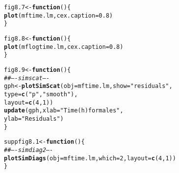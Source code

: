 \documentclass[12pt, a4paper,  BCOR=8.25mm, DIV=15]{scrartcl}\usepackage[]{graphicx}\usepackage[]{color}
\makeatletter
\newcommand{\hlnum}[1]{\textcolor[rgb]{0.686,0.059,0.569}{#1}}%
\newcommand{\hlstr}[1]{\textcolor[rgb]{0.192,0.494,0.8}{#1}}%
\newcommand{\hlcom}[1]{\textcolor[rgb]{0.678,0.584,0.686}{\textit{#1}}}%
\newcommand{\hlstd}[1]{\textcolor[rgb]{0.345,0.345,0.345}{#1}}%
\newcommand{\hlkwa}[1]{\textcolor[rgb]{0.161,0.373,0.58}{\textbf{#1}}}%
\newcommand{\hlkwb}[1]{\textcolor[rgb]{0.69,0.353,0.396}{#1}}%
\newcommand{\hlkwc}[1]{\textcolor[rgb]{0.333,0.667,0.333}{#1}}%
\newcommand{\hlkwd}[1]{\textcolor[rgb]{0.737,0.353,0.396}{\textbf{#1}}}%
\newenvironment{kframe}{%
 \def\at@end@of@kframe{}%
 \ifinner\ifhmode%
  \def\at@end@of@kframe{\end{minipage}}%
  \begin{minipage}{\columnwidth}%
 \fi\fi%
 \def\FrameCommand##1{\hskip\@totalleftmargin \hskip-\fboxsep
 \colorbox{shadecolor}{##1}\hskip-\fboxsep
     \hskip-\linewidth \hskip-\@totalleftmargin \hskip\columnwidth}%
 \MakeFramed {\advance\hsize-\width
   \@totalleftmargin\z@ \linewidth\hsize
   \@setminipage}}%
 {\par\unskip\endMakeFramed%
 \at@end@of@kframe}
\newenvironment{knitrout}{}{} %
\makeatother
\begin{document}
\begin{knitrout}
\color{fgcolor}\begin{kframe}
\begin{alltt}
\hlstd{fig8.7} \hlkwb{<-} \hlkwa{function}\hlstd{()\{}
\hlkwd{plot}\hlstd{(mftime.lm,} \hlkwc{cex.caption}\hlstd{=}\hlnum{0.8}\hlstd{)}
\hlstd{\}}
\end{alltt}
\end{kframe}
\end{knitrout}

\begin{knitrout}
\color{fgcolor}\begin{kframe}
\begin{alltt}
\hlstd{fig8.8} \hlkwb{<-} \hlkwa{function}\hlstd{()\{}
\hlkwd{plot}\hlstd{(mflogtime.lm,} \hlkwc{cex.caption}\hlstd{=}\hlnum{0.8}\hlstd{)}
\hlstd{\}}
\end{alltt}
\end{kframe}
\end{knitrout}

\begin{knitrout}
\color{fgcolor}\begin{kframe}
\begin{alltt}
\hlstd{fig8.9} \hlkwb{<-} \hlkwa{function}\hlstd{()\{}
\hlcom{## ---- simscat ----}
\hlstd{gph} \hlkwb{<-} \hlkwd{plotSimScat}\hlstd{(}\hlkwc{obj}\hlstd{=mftime.lm,} \hlkwc{show}\hlstd{=}\hlstr{"residuals"}\hlstd{,}
                   \hlkwc{type}\hlstd{=}\hlkwd{c}\hlstd{(}\hlstr{"p"}\hlstd{,}\hlstr{"smooth"}\hlstd{),}
                   \hlkwc{layout}\hlstd{=}\hlkwd{c}\hlstd{(}\hlnum{4}\hlstd{,}\hlnum{1}\hlstd{))}
\hlkwd{update}\hlstd{(gph,} \hlkwc{xlab}\hlstd{=}\hlstr{"Time (h) for males"}\hlstd{,}
      \hlkwc{ylab}\hlstd{=}\hlstr{"Residuals"}\hlstd{)}
\hlstd{\}}
\end{alltt}
\end{kframe}
\end{knitrout}

\begin{knitrout}
\color{fgcolor}\begin{kframe}
\begin{alltt}
\hlstd{suppfig8.1} \hlkwb{<-} \hlkwa{function}\hlstd{()\{}
\hlcom{## ---- simdiag2 ----}
\hlkwd{plotSimDiags}\hlstd{(}\hlkwc{obj}\hlstd{=mftime.lm,} \hlkwc{which}\hlstd{=}\hlnum{2}\hlstd{,} \hlkwc{layout}\hlstd{=}\hlkwd{c}\hlstd{(}\hlnum{4}\hlstd{,}\hlnum{1}\hlstd{))}
\hlstd{\}}
\end{alltt}
\end{kframe}
\end{knitrout}
\end{document}
